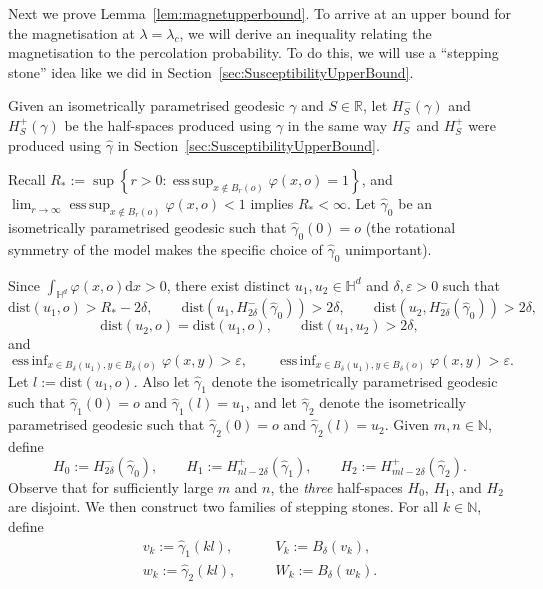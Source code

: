 \documentclass[10pt,a4paper,dvipsnames]{article}
\theoremstyle{definition}
\theoremstyle{remark}
\newcommand{\R}{\mathbb R}
\newcommand{\N}{\mathbb N}
\newcommand{\HypDim}{{\mathbb{H}^d}}
\newcommand{\dd}{\mathrm{d}} %
\DeclareMathOperator*{\esssup}{ess\,sup}
\DeclareMathOperator*{\essinf}{ess\,inf}
\newcommand{\dist}[1]{\mathrm{dist}\left(#1\right)}
\newcommand{\orig}{o}
\newcommand{\connf}{\varphi}
\numberwithin{equation}{section}
\begin{document}
Next we prove Lemma~\ref{lem:magnetupperbound}.
To arrive at an upper bound for the magnetisation at $\lambda=\lambda_c$, we will derive an inequality relating the magnetisation to the percolation probability. 
To do this, we will use a ``stepping stone'' idea like we did in Section~\ref{sec:SusceptibilityUpperBound}.

Given an isometrically parametrised geodesic $\gamma$ and $S\in\R$, let $H^-_S\left(\gamma\right)$ and $H^+_S\left(\gamma\right)$ be the half-spaces produced using $\gamma$ in the same way $H^-_S$ and $H^+_S$ were produced using $\hat\gamma$ in Section~\ref{sec:SusceptibilityUpperBound}.

Recall $R_* := \sup\left\{r>0\colon \esssup_{x\not\in B_r\left(\orig\right)}\connf(x,\orig) = 1\right\}$, and $\lim_{r\to\infty}\esssup_{x\not\in B_r\left(\orig\right)}\connf\left(x,\orig\right)<1$ implies $R_*<\infty$. Let $\hat\gamma_0$ be an isometrically parametrised geodesic such that $\hat\gamma_0(0)=\orig$ (the rotational symmetry of the model makes the specific choice of $\hat\gamma_0$ unimportant).

Since $\int_\HypDim\connf\left(x,\orig\right)\dd x >0$, there exist distinct $u_1,u_2\in\HypDim$ and $\delta,\varepsilon>0$ such that
\begin{equation}
    \dist{u_1,\orig} > R_*-2\delta,\qquad \dist{u_1,H^-_{2\delta}\left(\hat\gamma_0\right)}>2\delta,
    \qquad \dist{u_2,H^-_{2\delta}\left(\hat\gamma_0\right)} > 2\delta,
\end{equation}
\begin{equation}
    \dist{u_2,\orig} =\dist{u_1,\orig},\qquad\dist{u_1,u_2} > 2\delta,
\end{equation}
and
\begin{equation}
    \essinf_{x\in B_\delta\left(u_1\right),y\in B_\delta\left(\orig\right)}\connf\left(x,y\right) >\varepsilon,\qquad \essinf_{x\in B_\delta\left(u_1\right),y\in B_\delta\left(\orig\right)}\connf\left(x,y\right) >\varepsilon.
\end{equation}
Let $l:=\dist{u_1,\orig}$. Also let $\hat\gamma_1$ denote the isometrically parametrised geodesic such that $\hat\gamma_1\left(0\right)=\orig$ and $\hat\gamma_1\left(l\right) = u_1$, and let $\hat\gamma_2$ denote the isometrically parametrised geodesic such that $\hat\gamma_2\left(0\right)=\orig$ and $\hat\gamma_2\left(l\right) = u_2$. Given $m,n\in\N$, define
\begin{equation}
    H_0 := H^-_{2\delta}\left(\hat\gamma_0\right),\qquad H_1:= H^+_{nl-2\delta}\left(\hat\gamma_1\right),\qquad H_2:= H^+_{ml-2\delta}\left(\hat\gamma_2\right).
\end{equation}
Observe that for sufficiently large $m$ and $n$, the \emph{three} half-spaces $H_0$, $H_1$, and $H_2$ are disjoint. We then construct two families of stepping stones. For all $k\in\N$, define
\begin{align}
    v_k := \hat\gamma_1\left(kl\right),& \qquad V_k:= B_\delta\left(v_k\right),\\
    w_k := \hat \gamma_2\left(kl\right),&\qquad W_k:=B_\delta\left(w_k\right).
\end{align}
\end{document}
